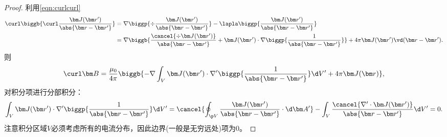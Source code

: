 \begin{proof}
    利用\eqref{eqn:curlcurl}
    \begin{align*}
        \curl\biggb{\curl\frac{\bm J(\bm r')}{\abs{\bm r-\bm r'}}}&=\nabla\biggp{\div\frac{\bm J(\bm r')}{\abs{\bm r-\bm r'}}}-\lapla\biggp{\frac{\bm J(\bm r')}{\abs{\bm r-\bm r'}}}\\
        &=\nabla\biggb{\frac{\cancel{\div\bm J(\bm r')}}{\abs{\bm r-\bm r'}}+\bm J(\bm r')\cdot\nabla\biggp{\frac1{\abs{\bm r-\bm r'}}}}+4\pi\bm J(\bm r')\vd(\bm r-\bm r').
    \end{align*}
    则
    \[
        \curl\bm B=\frac{\mu_0}{4\pi}\biggb{-\nabla\int_V\bm J(\bm r')\cdot\nabla'\biggp{\frac1{\abs{\bm r-\bm r'}}}\d V'+4\pi\bm J(\bm r)},
    \]
    对积分项进行分部积分：
    \[
        \int_V\bm J(\bm r')\cdot\nabla'\biggp{\frac1{\abs{\bm r-\bm r'}}}\d V'=\cancel{\oint_{\p V}\frac{\bm J(\bm r')}{\abs{\bm r-\bm r'}}\cdot\d\bm A'}-\int_V\frac{\cancel{\nabla'\cdot\bm J(\bm r')}}{\abs{\bm r-\bm r'}}\d V'=0.
    \]
    注意积分区域$V$必须考虑所有的电流分布，因此边界(一般是无穷远处)项为0。
\end{proof}

